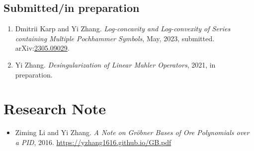 \documentclass[a4paper,12pt]{article}
\begin{document}
\subsection*{Submitted/in preparation}
\begin{enumerate}
\item Dmitrii Karp and Yi Zhang. {\em Log-concavity and Log-convexity of Series containing Multiple Pochhammer Symbols}, May, 2023, submitted. 
arXiv:\href{https://arxiv.org/abs/2305.09029}{2305.09029}. 
\item Yi Zhang. 
{\em Desingularization of Linear Mahler Operators}, 2021, in preparation.
\end{enumerate}

\section*{\Large{Research Note}}
\begin{itemize}
 \item Ziming Li and Yi Zhang. {\em A Note on Gr\"{o}bner Bases of Ore Polynomials over a PID}, 2016. 
 \url{https://yzhang1616.github.io/GB.pdf} 
\end{itemize}
\end{document}
